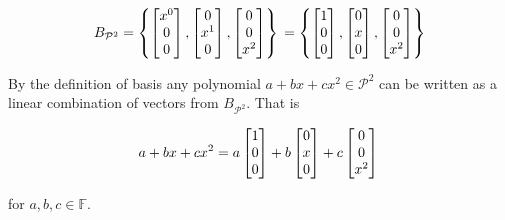\documentclass[11pt, oneside]{article}   	%
\begin{document}
\begin{equation*}
B_{\mathcal{P}^2} = \left \{ \begin{bmatrix} x^0 \\ 0 \\0 \end{bmatrix}, \begin{bmatrix} 0 \\ x^1 \\0 \end{bmatrix}, \begin{bmatrix} 0 \\ 0 \\ x^2 \end{bmatrix} \right \} \\
=  \left \{ \begin{bmatrix} 1 \\ 0 \\0 \end{bmatrix}, \begin{bmatrix} 0 \\ x \\0 \end{bmatrix}, \begin{bmatrix} 0 \\ 0 \\ x^2 \end{bmatrix} \right \}
\end{equation*} 

\bigskip
\noindent
By the definition of basis any polynomial $a +bx +cx^2 \in \mathcal{P}^2$ can be written as a linear combination of vectors from $B_{\mathcal{P}^2}$. That is 


\begin{equation*}
a +bx +cx^2 = a  \begin{bmatrix} 1 \\ 0 \\0 \end{bmatrix} + b \begin{bmatrix} 0 \\ x \\0 \end{bmatrix} + c \begin{bmatrix} 0 \\ 0 \\ x^2 \end{bmatrix} \\
\end{equation*}

\noindent
for $a,b,c \in \mathbb{F}$. 
\end{document}
